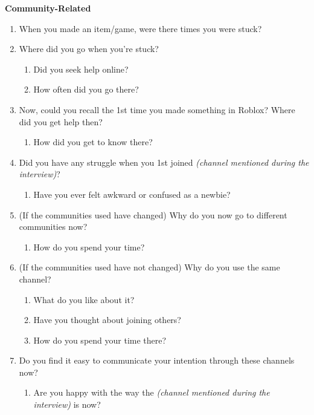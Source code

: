 \begin{appendix}
\noindent\textbf{Community-Related}
\begin{enumerate}[label=\arabic*., topsep=1pt, noitemsep]
    \item When you made an item/game, were there times you were stuck?
    \item Where did you go when you’re stuck?
        \begin{enumerate}
            \item Did you seek help online?
            \item How often did you go there?
        \end{enumerate}
    \item Now, could you recall the 1st time you made something in Roblox? Where did you get help then?
        \begin{enumerate}
            \item How did you get to know there?
        \end{enumerate}
    \item Did you have any struggle when you 1st joined \textit{(channel mentioned during the interview)}?
        \begin{enumerate}
            \item Have you ever felt awkward or confused as a newbie?
        \end{enumerate}
    \item (If the communities used have changed) Why do you now go to different communities now?
        \begin{enumerate}
            \item How do you spend your time?
        \end{enumerate}
    \item (If the communities used have not changed) Why do you use the same channel?
        \begin{enumerate}
            \item What do you like about it?
            \item Have you thought about joining others?
            \item How do you spend your time there?
        \end{enumerate}
    \item Do you find it easy to communicate your intention through these channels now?
        \begin{enumerate}
            \item Are you happy with the way the \textit{(channel mentioned during the interview)} is now?
        \end{enumerate}
    

\end{enumerate}
\end{appendix}
